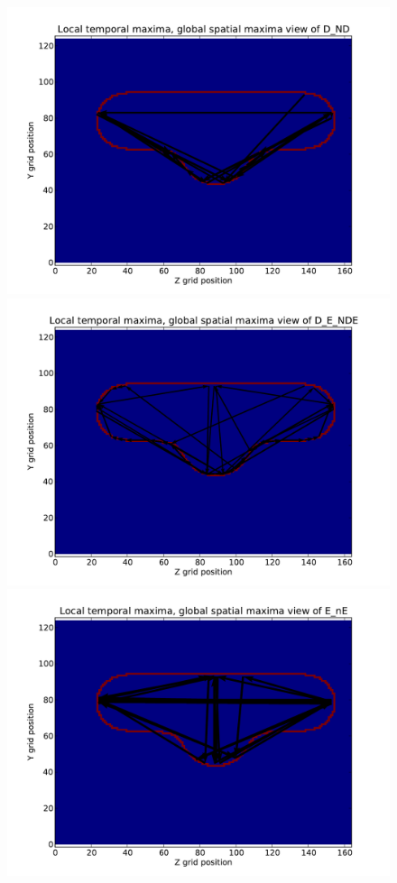 \documentclass[letterpaper,twocolumn,amsmath,amssymb,pre]{revtex4-1}
\begin{document}
\begin{figure}
  \includegraphics[width=\columnwidth]{../data/shape-randst/plots/arrow-plot-D_ND-randst-25-800-600-9700-1500}
  \includegraphics[width=\columnwidth]{../data/shape-randst/plots/arrow-plot-D_E_NDE-randst-25-800-600-9700-1500}
  \includegraphics[width=\columnwidth]{../data/shape-randst/plots/arrow-plot-E_nE-randst-25-800-600-9700-1500}

\end{figure}
\end{document}
